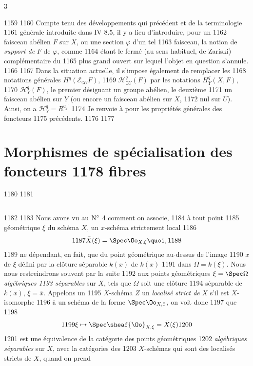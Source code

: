 3	\documentclass[10pt]{../fichiers-configuration-latex/smfart}
\begin{document}
  1159	
  1160	Compte tenu des développements qui précédent et de la terminologie
  1161	générale introduite dans IV 8.5, il y a lieu d'introduire, pour un
  1162	faisceau abélien $F$ sur $X$, ou une section $\varphi$ d'un tel
  1163	faisceau, la notion de \emph{support de} $F$ \resp de $\varphi$, comme
  1164	étant le fermé (au sens habituel, \ie de Zariski) complémentaire du
  1165	plus grand ouvert sur lequel l'objet en question s'annule.
  1166	
  1167	Dans la situation actuelle, il s'impose également de remplacer les
  1168	notations générales  $H^q (ℰ_{\complement U} F)$,
  1169	$ℋ^q_{\complement U} (F)$ par les notations $H^{q}_Y (X, F)$,
  1170	$ℋ^{q}_Y (F)$, le premier désignant un groupe abélien, le deuxième
  1171	un faisceau abélien sur $Y$ (ou encore un faisceau abélien sur $X$,
  1172	nul sur $U$). Ainsi, on a $ℋ^{q}_Y  = R^{q_{y}!}$ 	
  1174	Je renvoie à  pour les propriétés générales des foncteurs
  1175	précédents.
  1176	
  1177	\section{Morphismes de spécialisation des foncteurs
  1178	  fibres}	
  1180	
  1181	\subsection{}
  1182	
  1183	Nous avons vu au ${\rm N^{\circ}}$ 4 comment on associe,
  1184	à tout point
  1185	géométrique $\xi$ du schéma $X$, un $x$-schéma strictement local
  1186	$$
  1187	\bar{X}(\xi) = \Spec \Oo_{X, \xi}{\quoi},
  1188	$$
  1189	ne dépendant, en fait, que du point géométrique au-dessus de l'image
  1190	$x$ de $\xi$ défini par la clôture séparable $\bar{k(x)}$ de $k(x)$
  1191	dans $\Omega = k(\xi)$. Nous nous restreindrons souvent par la suite
  1192	aux points géométriques $\xi = \Spec \Omega$ \emph{algébriques
  1193	  séparables} sur $X$, \ie tels que $\Omega$ soit une clôture
  1194	séparable de $k(x)$, \ie $\xi = \bar{x}$. Appelons un
  1195	$X$-schéma $Z$ un \emph{localisé strict de} $X$ s'il est $X$-isomorphe
  1196	à un schéma de la forme $\Spec \Oo_{X, \bar{x}}$, on voit donc
  1197	que
  1198	$$
  1199	\xi \mapsto \Spec \sheaf{\Oo}_{X, \xi} = \bar{X}(\xi)
  1200	$$
  1201	est une équivalence de la catégorie des points géométriques
  1202	\emph{algébriques séparables} sur $X$, avec la catégories des
  1203	$X$-schémas qui sont des localisés stricts de $X$, quand on prend
\end{document}

